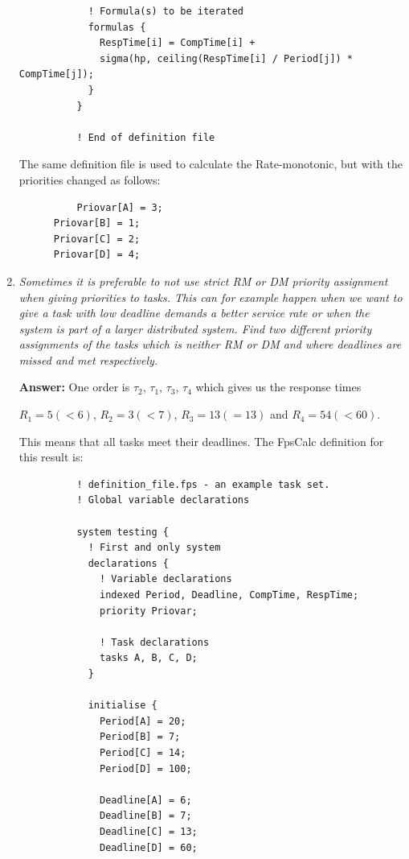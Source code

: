 \documentclass[a4paper,10pt]{article}
\newcommand{\answer}{\textbf{Answer: }}
\begin{document}
\begin{enumerate}
\begin{lstlisting}
            ! Formula(s) to be iterated
            formulas {
              RespTime[i] = CompTime[i] +
              sigma(hp, ceiling(RespTime[i] / Period[j]) * CompTime[j]);
            }
          }				   
          
          ! End of definition file
        \end{lstlisting}
        
        The same definition file is used to calculate the Rate-monotonic, but with the priorities changed as follows:
        
        \begin{lstlisting}
          Priovar[A] = 3;
	  Priovar[B] = 1;
	  Priovar[C] = 2;
	  Priovar[D] = 4;
        \end{lstlisting}

	\item \emph{Sometimes it is preferable to not use strict RM or DM priority assignment when giving priorities to tasks. This can for example happen when we want to give a task with low deadline demands a better service rate or when the system is part of a larger distributed system. Find two different priority assignments of the tasks which is neither RM or DM and where deadlines are missed and met respectively.}
	
	\answer One order is $\tau_2$, $\tau_1$, $\tau_3$, $\tau_4$ which gives us the response times 
	
	$R_1 = 5 (< 6)$, $R_2 = 3 (< 7)$, $R_3 = 13 (= 13)$ and $R_4 = 54 (< 60)$. 
	
	This means that all tasks meet their deadlines. The FpsCalc definition for this result is:

        \begin{lstlisting}
          ! definition_file.fps - an example task set.
          ! Global variable declarations
          
          system testing {
            ! First and only system
            declarations {		
              ! Variable declarations
              indexed Period, Deadline, CompTime, RespTime;
              priority Priovar;	
              
              ! Task declarations
              tasks A, B, C, D;
            }
            
            initialise {
              Period[A] = 20;
              Period[B] = 7;
              Period[C] = 14;
              Period[D] = 100;
              
              Deadline[A] = 6;
              Deadline[B] = 7;
              Deadline[C] = 13;
              Deadline[D] = 60;
              

\end{lstlisting}
\end{enumerate}
\end{document}
